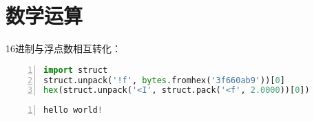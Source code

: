 \section{数学运算}
16进制与浮点数相互转化：
\begin{lstlisting}[language=python,numbers=left,firstnumber = 1,breaklines = true,numberstyle=\tiny,keywordstyle=\color{blue!70},commentstyle=\color{red!50!green!50!blue!50},frame=shadowbox, rulesepcolor=\color{red!20!green!20!blue!20}]
import struct
struct.unpack('!f', bytes.fromhex('3f660ab9'))[0]
hex(struct.unpack('<I', struct.pack('<f', 2.0000))[0])
\end{lstlisting}


\begin{lstlisting}[title=abcdefg,language=python,numbers=left,firstnumber = 1,breaklines = true,numberstyle=\tiny,keywordstyle=\color{blue!70},commentstyle=\color{red!50!green!50!blue!50},frame=shadowbox, rulesepcolor=\color{red!20!green!20!blue!20}]
    hello world!
\end{lstlisting}

